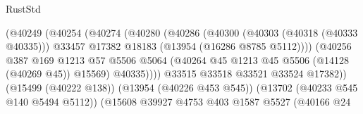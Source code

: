\begin{lexlean}{RustStd}
\begin{coremodule}
                                              (@40249
                                                (@40254
                                                  (@40274
                                                    (@40280
                                                      (@40286
                                                        (@40300
                                                          (@40303 (@40318 (@40333 @40335)))
                                                          @33457
                                                          @17382
                                                          @18183
                                                          (@13954 (@16286 @8785 @5112))))
                                                      (@40256
                                                        @387
                                                        @169
                                                        @1213
                                                        @57
                                                        @5506
                                                        @5064
                                                        (@40264
                                                          @45
                                                          @1213
                                                          @45
                                                          @5506
                                                          (@14128 (@40269 @45))
                                                          @15569)
                                                        @40335))))
                                                @33515
                                                @33518
                                                @33521
                                                @33524
                                                @17382))
                                            (@15499 (@40222 @138))
                                            (@13954 (@40226 @453 @545))
                                            (@13702 (@40233 @545 @140 @5494 @5112))
                                            (@15608
                                              @39927
                                              @4753
                                              @403
                                              @1587
                                              @5527
                                              (@40166
                                                @24

\end{coremodule}
\end{lexlean}
